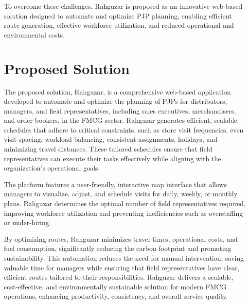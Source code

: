 To overcome these challenges, Rahguzar is proposed as an innovative web-based solution designed to automate and optimize PJP planning, enabling efficient route generation, effective workforce utilization, and reduced operational and environmental costs.
\section{Proposed Solution}


The proposed solution, Rahguzar, is a comprehensive web-based application developed to automate and optimize the planning of PJPs for distributors, managers, and field representatives, including sales executives, merchandisers, and order bookers, in the FMCG sector. Rahguzar generates efficient, scalable schedules that adhere to critical constraints, such as store visit frequencies, even visit spacing, workload balancing, consistent assignments, holidays, and minimizing travel distances. These tailored schedules ensure that field representatives can execute their tasks effectively while aligning with the organization’s operational goals.

The platform features a user-friendly, interactive map interface that allows managers to visualize, adjust, and schedule visits for daily, weekly, or monthly plans. Rahguzar determines the optimal number of field representatives required, improving workforce utilization and preventing inefficiencies such as overstaffing or under-hiring.

By optimizing routes, Rahguzar minimizes travel times, operational costs, and fuel consumption, significantly reducing the carbon footprint and promoting sustainability. This automation reduces the need for manual intervention, saving valuable time for managers while ensuring that field representatives have clear, efficient routes tailored to their responsibilities. Rahguzar delivers a scalable, cost-effective, and environmentally sustainable solution for modern FMCG operations, enhancing productivity, consistency, and overall service quality.

